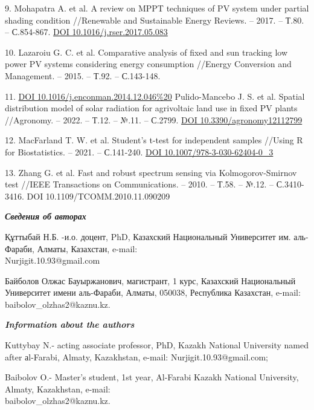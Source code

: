 \begin{references}
9. Mohapatra A. et al. A review on MPPT techniques of PV system under
partial shading condition //Renewable and Sustainable Energy Reviews.
-- 2017. -- Т.80. -- С.854-867.
\href{https://doi.org/10.1016/j.rser.2017.05.083}{DOI 10.1016/j.rser.2017.05.083}

10. Lazaroiu G. C. et al. Comparative analysis of fixed and sun
tracking low power PV systems considering energy consumption //Energy
Conversion and Management. -- 2015. -- Т.92. -- С.143-148.

11. \href{https://doi.org/10.1016/j.enconman.2014.12.046\%20}{DOI 10.1016/j.enconman.2014.12.046\%20}
Pulido-Mancebo J. S. et al. Spatial distribution model of solar
radiation for agrivoltaic land use in fixed PV plants //Agronomy. --
2022. -- Т.12. -- №.11. -- С.2799.
\href{https://doi.org/10.3390/agronomy12112799}{DOI 10.3390/agronomy12112799}

12. MacFarland T. W. et al. Student's t-test for independent samples
//Using R for Biostatistics. -- 2021. -- С.141-240.
\href{https://doi.org/10.1007/978-3-030-62404-0_3}{DOI 10.1007/978-3-030-62404-0\_3}

13. Zhang G. et al. Fast and robust spectrum sensing via
Kolmogorov-Smirnov test //IEEE Transactions on Communications. --
2010. -- Т.58. -- №.12. -- С.3410-3416.
DOI 10.1109/TCOMM.2010.11.090209
\end{references}

\begin{authorinfo}
\emph{{\bfseries Сведения об авторах}}

Құттыбай Н.Б. -и.о. доцент, PhD, Казахский Национальный Университет им. аль-Фараби, Алматы, Казахстан, e-mail: \\Nurjigit.10.93@gmail.com

Байболов Олжас Бауыржанович, магистрант, 1 курс, Казахский Национальный Университет имени аль-Фараби, Алматы, 050038, Республика Казахстан, e-mail: baibolov\_olzhas2@kaznu.kz. 

\emph{{\bfseries Information about the authors}}

Kuttybay N.- acting associate professor, PhD, Kazakh National University named after аl-Farabi, Almaty, Kazakhstan, e-mail: Nurjigit.10.93@gmail.com; 

Baibolov O.- Master's student, 1st year, Al-Farabi Kazakh National University, Almaty, Kazakhstan, 
e-mail: \\baibolov\_olzhas2@kaznu.kz. 
\end{authorinfo}
